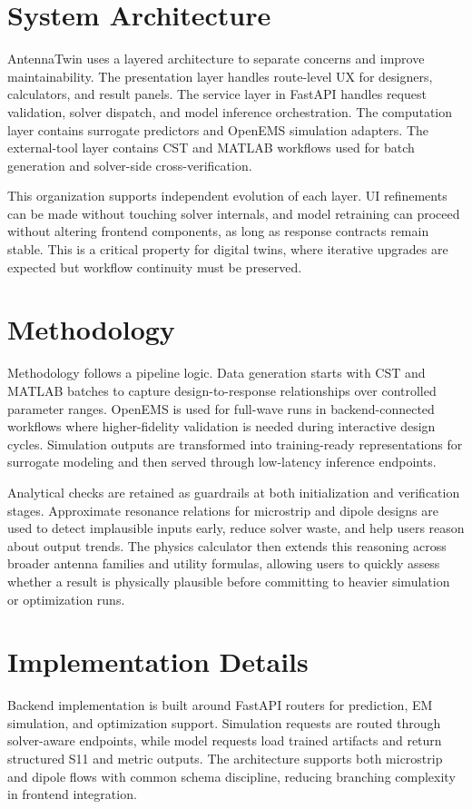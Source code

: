 \documentclass[12pt,a4paper]{article}
\begin{document}
\section{System Architecture}
AntennaTwin uses a layered architecture to separate concerns and improve maintainability. The presentation layer handles route-level UX for designers, calculators, and result panels. The service layer in FastAPI handles request validation, solver dispatch, and model inference orchestration. The computation layer contains surrogate predictors and OpenEMS simulation adapters. The external-tool layer contains CST and MATLAB workflows used for batch generation and solver-side cross-verification.

This organization supports independent evolution of each layer. UI refinements can be made without touching solver internals, and model retraining can proceed without altering frontend components, as long as response contracts remain stable. This is a critical property for digital twins, where iterative upgrades are expected but workflow continuity must be preserved.

\section{Methodology}
Methodology follows a pipeline logic. Data generation starts with CST and MATLAB batches to capture design-to-response relationships over controlled parameter ranges. OpenEMS is used for full-wave runs in backend-connected workflows where higher-fidelity validation is needed during interactive design cycles. Simulation outputs are transformed into training-ready representations for surrogate modeling and then served through low-latency inference endpoints.

Analytical checks are retained as guardrails at both initialization and verification stages. Approximate resonance relations for microstrip and dipole designs are used to detect implausible inputs early, reduce solver waste, and help users reason about output trends. The physics calculator then extends this reasoning across broader antenna families and utility formulas, allowing users to quickly assess whether a result is physically plausible before committing to heavier simulation or optimization runs.

\section{Implementation Details}
Backend implementation is built around FastAPI routers for prediction, EM simulation, and optimization support. Simulation requests are routed through solver-aware endpoints, while model requests load trained artifacts and return structured S11 and metric outputs. The architecture supports both microstrip and dipole flows with common schema discipline, reducing branching complexity in frontend integration.
\end{document}

